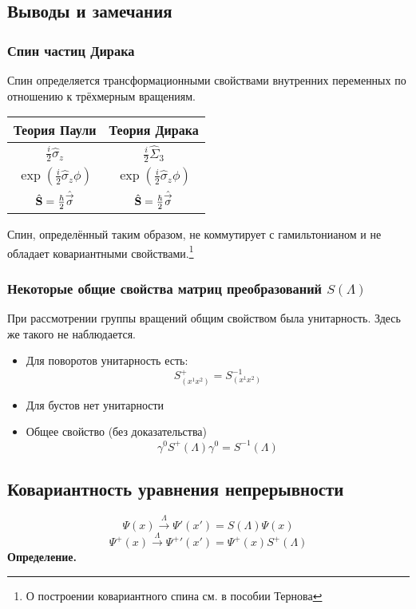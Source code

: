 \subsection{Выводы и замечания}
\subsubsection{Спин частиц Дирака}
Спин определяется трансформационными свойствами внутренних переменных по отношению к трёхмерным вращениям.

\begin{center}
\begin{tabular}{|c|c|}
  \hline
  Теория Паули & Теория Дирака \\
  \hline
  $\frac{i}{2} \hat \sigma_z$ & $\frac{i}{2} \hat \Sigma_3$ \\
  \hline  
  $\exp(\frac{i}{2} \hat \sigma_z \phi)$ & $\exp( \frac{i}{2}\hat \sigma_z \phi)$ \\
  \hline
   $\hat {\bf S} = \frac{\hbar}{2} \hat{\vec \sigma}$ & $\hat {\bf S} = \frac{\hbar}{2} \hat{\vec \sigma}$\\
  \hline   
\end{tabular}
\end{center}

Спин, определённый таким образом, не коммутирует с гамильтонианом и не обладает ковариантными свойствами.\footnote{О построении ковариантного спина см. в пособии Тернова}

\subsubsection{Некоторые общие свойства матриц преобразований $S(\Lambda)$} 
При рассмотрении группы вращений общим свойством была унитарность. Здесь же такого не наблюдается.

\begin{itemize}
  \item Для поворотов унитарность есть:
  $$
    S_{(x^1 x^2)}^{+} = S_{(x^1 x^2)}^{-1}
  $$
  \item Для бустов нет унитарности
  \item Общее свойство (без доказательства)
  $$
  \boxed{
    \gamma^0 S^+ (\Lambda) \gamma^0 = S^{-1} (\Lambda)
  }
  $$
\end{itemize}
\subsection{Ковариантность уравнения непрерывности}
$$
    \Psi(x) \overset{\Lambda}\to \Psi'(x') = S(\Lambda) \Psi(x)
$$
$$
    \Psi^{+}(x) \overset{\Lambda}{\to} {\Psi^{+}}'(x') = \Psi^{+}(x)S^{+}(\Lambda) 
$$
\textbf{Определение.}

